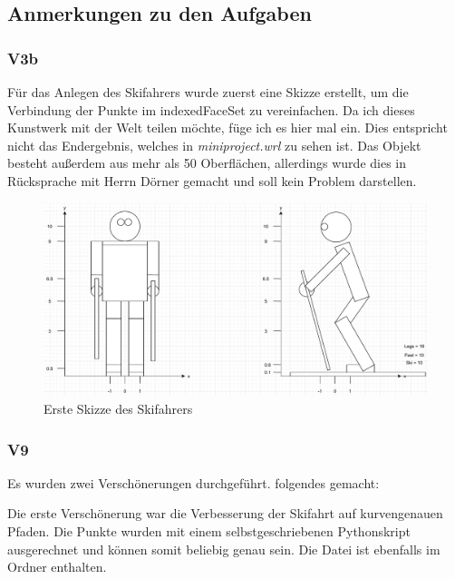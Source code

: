 \documentclass{article}
\begin{document}
\newpage

\subsection*{Anmerkungen zu den Aufgaben}
\subsubsection*{V3b}
Für das Anlegen des Skifahrers wurde zuerst eine Skizze erstellt, um die
Verbindung der Punkte im indexedFaceSet zu vereinfachen. Da ich dieses Kunstwerk
mit der Welt teilen möchte, füge ich es hier mal ein. Dies entspricht nicht das
Endergebnis, welches in \textit{miniproject.wrl} zu sehen ist. Das Objekt besteht
außerdem aus mehr als 50 Oberflächen, allerdings wurde dies in Rücksprache mit
Herrn Dörner gemacht und soll kein Problem darstellen.

\begin{figure}[h]
    \centering
    \includegraphics[scale=0.5]{skifahrer_sketch.pdf}
    \caption{Erste Skizze des Skifahrers}
\end{figure}

\subsubsection*{V9}
Es wurden zwei Verschönerungen durchgeführt. folgendes gemacht:

Die erste Verschönerung war die Verbesserung der Skifahrt auf kurvengenauen Pfaden.
Die Punkte wurden mit einem selbstgeschriebenen Pythonskript ausgerechnet und können
somit beliebig genau sein. Die Datei ist ebenfalls im Ordner enthalten.
\end{document}
